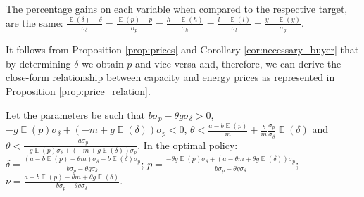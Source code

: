 \documentclass[informs]{informs3}
\begin{document}
\begin{corollary}\label{cor:necessary_buyer}
	The percentage gains on each variable when compared to the respective target, are the same:
$\frac{\mathop{\mathbb{E}}\left(\delta\right)-\delta}{\sigma_{\delta}}= \frac{\mathop{\mathbb{E}}\left(p\right)-p}{\sigma_{p}}=\frac{h-\mathop{\mathbb{E}}\left(h\right)}{\sigma_{h}}=\frac{l-\mathop{\mathbb{E}}\left(l\right)}{\sigma_{l}}=
\frac{y-\mathop{\mathbb{E}}\left(y\right)}{\sigma_{y}}$.
\end{corollary}


It follows from Proposition \ref{prop:prices} and Corollary \ref{cor:necessary_buyer} that by determining $\delta$ we obtain $p$ and vice-versa and, therefore, we can derive the close-form relationship between capacity and energy prices as represented in Proposition \ref{prop:price_relation}.


\begin{proposition}\label{prop:price_relation}
Let the parameters be such that $b\sigma_{p}-\theta g\sigma_{\delta} > 0$, $- g \mathop{\mathbb{E}}\left(p\right)\sigma_{\delta}+\left(-m+g \mathop{\mathbb{E}}\left(\delta\right)\right)\sigma_{p}<0$, 
$ \theta < \frac{a-b\mathop{\mathbb{E}}\left(p\right)}{m}   +\frac{b}{m} \frac{\sigma_{p}}{\sigma_{\delta}} \mathop{\mathbb{E}}\left(\delta\right)$ and
$\theta<\frac{-a\sigma_{p}}{- g \mathop{\mathbb{E}}\left(p\right)\sigma_{\delta}+\left(-m+g \mathop{\mathbb{E}}\left(\delta\right)\right)\sigma_{p}}$.   In the optimal policy: 
$\delta=\frac{\left(a-b\mathop{\mathbb{E}}\left(p\right) -\theta m\right)\sigma_{\delta}+b\mathop{\mathbb{E}}\left(\delta\right)\sigma_{p}}{b\sigma_{p}-\theta g\sigma_{\delta}}$;
$p =\frac{-\theta g \mathop{\mathbb{E}}\left(p\right)\sigma_{\delta}+\left(a-\theta m+\theta g \mathop{\mathbb{E}}\left(\delta\right)\right)\sigma_{p}}{b\sigma_{p}-\theta g\sigma_{\delta}}$;	
$\nu =\frac{a-b \mathop{\mathbb{E}}\left(p\right)-\theta m+\theta g \mathop{\mathbb{E}}\left(\delta\right)}{b\sigma_{p}-\theta g\sigma_{\delta}}$.
\end{proposition}
\end{document}
